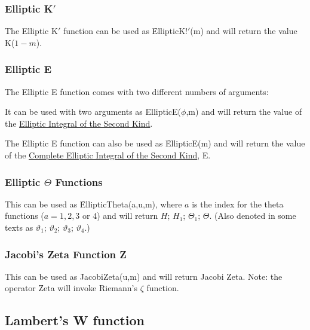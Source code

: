 \subsubsection{Elliptic K$'$}

The Elliptic K$'$ function can be used as \f{EllipticK!$'$(m)} and will 
return the value K($1-m$).

\subsubsection{Elliptic E}

The Elliptic E function comes with two different numbers of arguments:

It can be used with two arguments as \f{EllipticE($\phi$,m)}
and will return the value
of the {\underline {Elliptic Integral of the Second Kind}}.

The Elliptic E function can also be used as \f{EllipticE(m)} and 
will return the value of the {\underline {Complete Elliptic Integral 
of the Second Kind}}, E.

%
%
\subsubsection{Elliptic $\Theta$ Functions}

This can be used as \f{EllipticTheta(a,u,m)}, where $a$ is the index 
for the theta functions ($a = 1,2,3$ or $4$) and will return $H$; 
$H_1$; $\Theta_1$; $\Theta$. (Also denoted in some texts as 
$\vartheta_1$; $\vartheta_2$; $\vartheta_3$; $\vartheta_4$.)

\subsubsection{Jacobi's Zeta Function Z }

This can be used as \f{JacobiZeta(u,m)} and will return 
Jacobi Zeta. Note: the operator \f{Zeta} will invoke Riemann's
$\zeta$ function.

\subsection{Lambert's W function}

